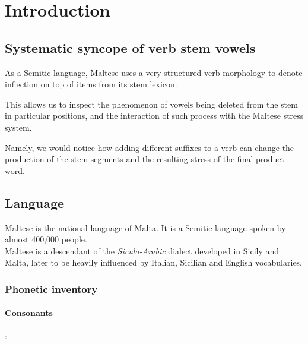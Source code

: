 \documentclass[11pt,draft]{article}
\begin{document}
\maketitle


\section{Introduction}

\subsection{Systematic syncope of verb stem vowels}

As a Semitic language, Maltese uses a very structured verb morphology to denote inflection on top of items from its stem lexicon.

This allows us to inspect the phenomenon of vowels being deleted from the stem in particular positions, and the interaction of such process with the Maltese stress system.

Namely, we would notice how adding different suffixes to a verb can change the production of the stem segments and the resulting stress of the final product word.

\subsection{Language}
Maltese is the national language of Malta. It is a Semitic language spoken by almost 400,000 people\cite{borg1997}.\\
Maltese is a descendant of the \emph{Siculo-Arabic} dialect developed in Sicily and Malta, later to be heavily influenced by Italian, Sicilian and English vocabularies.

\subsubsection{Phonetic inventory}

\paragraph{Consonants}
:

\end{document}
